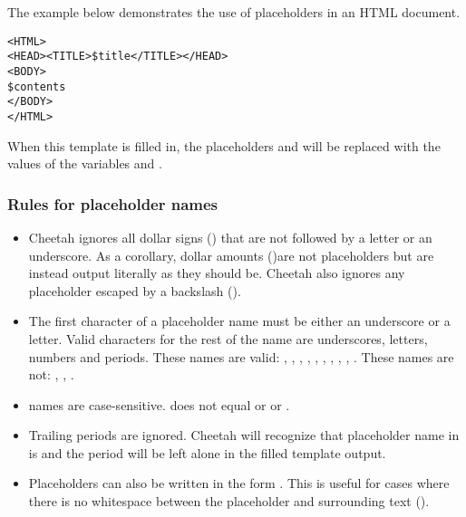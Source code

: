 The example below demonstrates the use of placeholders in an HTML document.

\begin{verbatim}
<HTML>
<HEAD><TITLE>$title</TITLE></HEAD>
<BODY>
$contents
</BODY>
</HTML>
\end{verbatim}

When this template is filled in, the placeholders  and
 will be replaced with the values of the variables 
and .

\subsubsection{Rules for placeholder names}
\begin{itemize} 

\item Cheetah ignores all dollar signs (\code{\$}) that are not followed
     by a letter or an underscore.  As a corollary, dollar amounts
     ()are not placeholders but are instead output literally as
     they should be.  Cheetah also ignores any placeholder escaped by a
     backslash ().
     
\item The first character of a placeholder name must be either an underscore or
     a letter. Valid characters for the rest of the name are underscores,
     letters, numbers and periods.  These names are valid: ,
     \code{\$_}, , , , ,
     , , ,
     .  These names are not: , ,
     .

\item names are case-sensitive.  does not equal 
     or  or .     
     
\item Trailing periods are ignored.  Cheetah will recognize that
     placeholder name in  is  and the period will
     be left alone in the filled template output.
     
\item Placeholders can also be written in the form .
     This is useful for cases where there is no whitespace between the
     placeholder and surrounding text ().
\end{itemize} 

